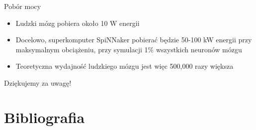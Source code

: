 \documentclass{beamer}
\begin{document}
\begin{frame}{Pobór mocy}

\begin{itemize}

\item Ludzki mózg pobiera około 10 W energii

\item Docelowo, superkomputer SpiNNaker pobierać będzie 50-100 kW energii przy maksymalnym obciążeniu, przy symulacji 1\% wszystkich neuronów mózgu

\item Teoretyczna wydajność ludzkiego mózgu jest więc 500,000 razy większa

\end{itemize}

\end{frame}


\begin{frame}

\Huge{Dziękujemy za uwagę!}

\end{frame}



\section{Bibliografia}


\begin{frame}
\end{frame}
\end{document}
